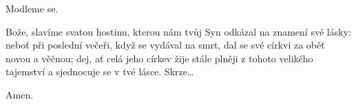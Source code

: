 \mbox{}

\Vbardot{} Modleme se.

Bože, slavíme svatou hostinu, kterou nám tvůj Syn odkázal na znamení své lásky: neboť při poslední večeři, když se vydával na smrt, dal se své církvi za oběť novou a věčnou; dej, ať celá jeho církev žije stále plněji z tohoto velikého tajemství a sjednocuje se v tvé lásce. Skrze…

\Rbardot{} Amen.
